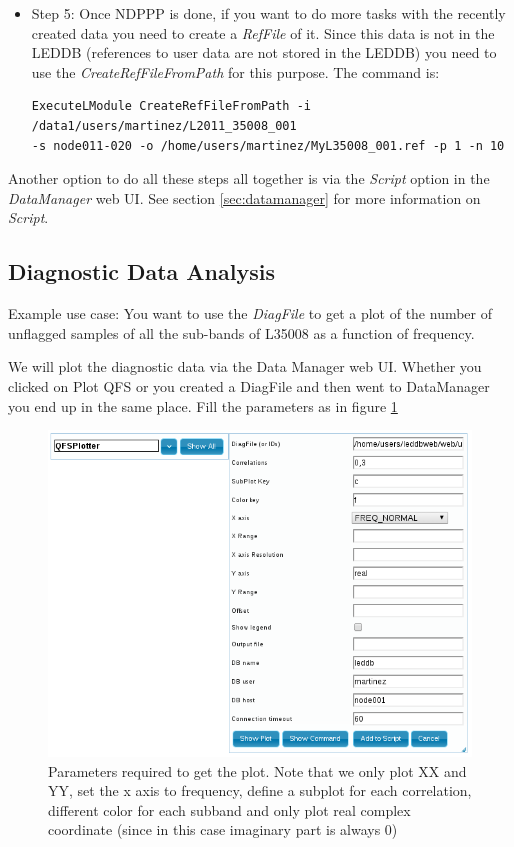 \documentclass[a4paper,11pt]{article}
\begin{document}
\begin{itemize}
	\item Step 5: Once NDPPP is done, if you want to do more tasks with the recently created data you need to create a \textit{RefFile} of it. Since this data is not in the LEDDB (references to user data are not stored in the LEDDB) you need to use the \textit{CreateRefFileFromPath} for this purpose. The command is:
\begin{verbatim}
ExecuteLModule CreateRefFileFromPath -i /data1/users/martinez/L2011_35008_001
-s node011-020 -o /home/users/martinez/MyL35008_001.ref -p 1 -n 10
\end{verbatim}
	
\end{itemize}

Another option to do all these steps all together is via the \textit{Script} option in the \textit{DataManager} web UI. See section \ref{sec:datamanager} for more information on \textit{Script}.

\subsection{Diagnostic Data Analysis}

Example use case: You want to use the \textit{DiagFile} to get a plot of the number of unflagged samples of all the sub-bands of L35008 as a function of frequency.

We will plot the diagnostic data via the Data Manager web UI. Whether you clicked on Plot QFS or you created a DiagFile and then went to DataManager you end up in the same place. Fill the parameters as in figure \ref{fig:plotqfs}

\begin{figure}[h]
	\centering
	\includegraphics[scale=0.5]{fig/plotqfs} 
	\caption{Parameters required to get the plot. Note that we only plot XX and YY, set the x axis to frequency, define a subplot for each correlation, different color for each subband and only plot real complex coordinate (since in this case imaginary part is always 0)}
	\label{fig:plotqfs}
\end{figure}
\end{document}
